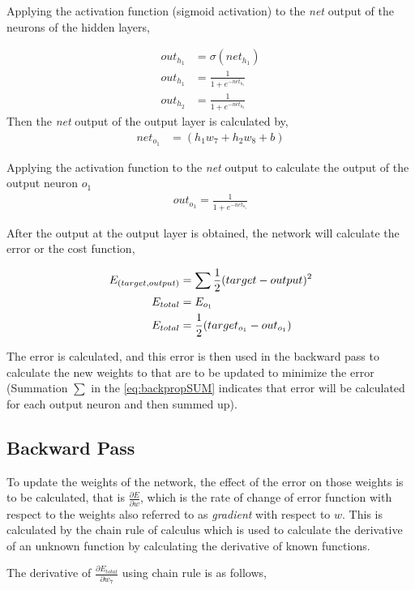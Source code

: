 Applying the activation function (sigmoid activation) to the \textit{net} output of the neurons of the hidden layers,

\begin{align}
    out_{h_{1}} &= \sigma (net_{h_{1}})\\
    out_{h_{1}} &= \frac{1}{1+e^{-net_{h_{1}}}}\\
    out_{h_{2}} &= \frac{1}{1+e^{-net_{h_{2}}}}
\end{align}
Then the \textit{net} output of the output layer is calculated by,
\begin{align}
    net_{o_{1}} &= (h_{1}w_{7}+h_{2}w_{8}+b)
\end{align}

Applying the activation function to the \textit{net} output to calculate the output of the output neuron $o_{1}$
\begin{align}
    out_{o_{1}} = \frac{1}{1+e^{-net_{o_{1}}}}
\end{align}

After the output at the output layer is obtained, the network will calculate the error or the cost function,

\begin{align}
    E_{\text(target, output)} &= \sum\frac{1}{2}(target-output)^2 \label{eq:backpropSUM} \\
    E_{total} &= E_{o_{1}} \\
    E_{total} &= \frac{1}{2}(target_{o_{1}}-out_{o_{1}})  
\end{align}

The error is calculated, and this error is then used in the backward pass to calculate the new weights to that are to be updated to minimize the error (Summation $\sum$ in the \ref{eq:backpropSUM} indicates that error will be calculated for each output neuron and then summed up).

\subsection*{Backward Pass}
To update the weights of the network, the effect of the error on those weights is to be calculated, that is $\frac{\partial E}{\partial w}$, which is the rate of change of error function with respect to the weights also referred to as \textit{gradient} with respect to $w$. This is calculated by the chain rule of calculus which is used to calculate the derivative of an unknown function by calculating the derivative of known functions.

The derivative of $\frac{\partial E_{total}}{\partial w_{7}}$ using chain rule is as follows,

